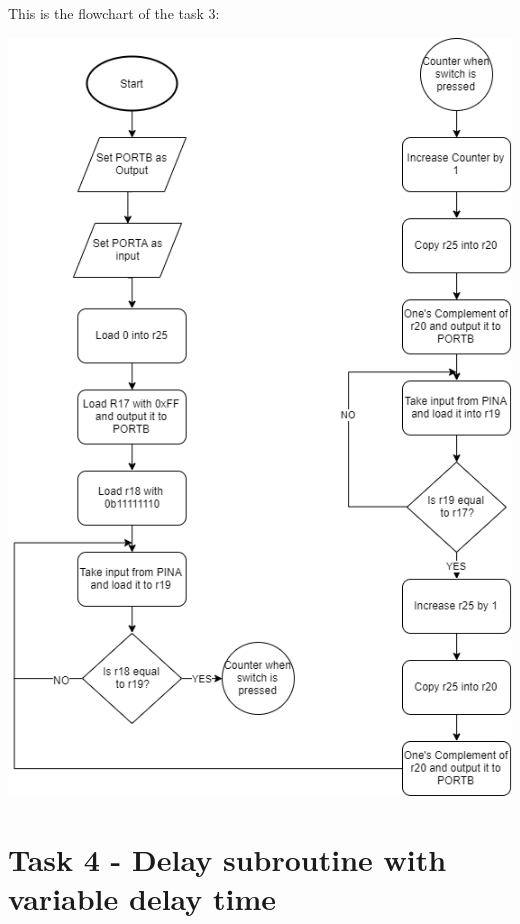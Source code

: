 \documentclass[a4paper,12pt]{article}
\begin{document}
\newpage
This is the flowchart of the task 3:
\begin{center}
\includegraphics[scale=0.8]{img/TASK3.png}
\end{center}

\newpage
\section{Task 4 - Delay subroutine with variable delay time}
\end{document}
